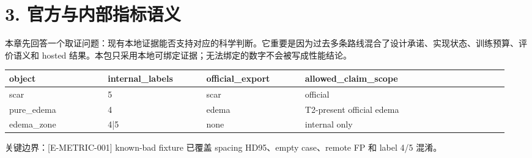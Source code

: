 \section{3. 官方与内部指标语义}

本章先回答一个取证问题：现有本地证据能否支持对应的科学判断。它重要是因为过去多条路线混合了设计承诺、实现状态、训练预算、评价语义和 hosted 结果。本包只采用本地可绑定证据；无法绑定的数字不会被写成性能结论。



\begin{longtable}{p{0.19\linewidth}p{0.19\linewidth}p{0.19\linewidth}p{0.19\linewidth}p{0.19\linewidth}}
\toprule
object & internal\_labels & official\_export & allowed\_claim\_scope\\
\midrule
scar & 5 & scar & official\\
pure\_edema & 4 & edema & T2-present official edema\\
edema\_zone & 4|5 & none & internal only\\
\bottomrule
\end{longtable}

关键边界：[E-METRIC-001] known-bad fixture 已覆盖 spacing HD95、empty case、remote FP 和 label 4/5 混淆。



\clearpage